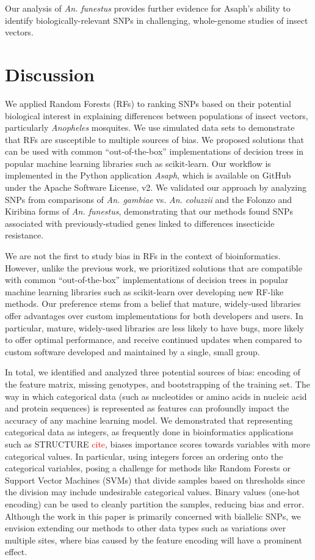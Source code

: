 Our analysis of \emph{An. funestus} provides further evidence for Asaph's ability to identify biologically-relevant SNPs in challenging, whole-genome studies of insect vectors.

\section{Discussion}
We applied Random Forests (RFs) to ranking SNPs based on their potential biological interest in explaining differences between populations of insect vectors, particularly \emph{Anopheles} mosquites.  We use simulated data sets to demonstrate that RFs are susceptible to multiple sources of bias. We proposed solutions that can be used with common ``out-of-the-box'' implementations of decision trees in popular machine learning libraries such as scikit-learn.  Our workflow is implemented in the Python application \emph{Asaph}, which is available on GitHub under the Apache Software License, v2.  We validated our approach by analyzing SNPs from comparisons of \emph{An. gambiae} vs. \emph{An. coluzzii} and the Folonzo and Kiribina forms of \emph{An. funestus}, demonstrating that our methods found SNPs associated with previously-studied genes linked to differences insecticide resistance.

We are not the first to study bias in RFs in the context of bioinformatics. However, unlike the previous work, we prioritized solutions that are compatible with common ``out-of-the-box'' implementations of decision trees in popular machine learning libraries such as scikit-learn over developing new RF-like methods.  Our preference stems from a belief that mature, widely-used libraries offer advantages over custom implementations for both developers and users.  In particular, mature, widely-used libraries are less likely to have bugs, more likely to offer optimal performance, and receive continued updates when compared to custom software developed and maintained by a single, small group.

In total, we identified and analyzed three potential sources of bias: encoding of the feature matrix, missing genotypes, and bootstrapping of the training set. The way in which categorical data (such as nucleotides or amino acids in nucleic acid and protein sequences) is represented as features can profoundly impact the accuracy of any machine learning model.  We demonstrated that representing categorical data as integers, as frequently done in bioinformatics applications such as STRUCTURE \textcolor{red}{cite}, biases importance scores towards variables with more categorical values.  In particular, using integers forces an ordering onto the categorical variables, posing a challenge for methods like Random Forests or Support Vector Machines (SVMs) that divide samples based on thresholds since the division may include undesirable categorical values.  Binary values (one-hot encoding) can be used to cleanly partition the samples, reducing bias and error.  Although the work in this paper is primarily concerned with biallelic SNPs, we envision extending our methods to other data types such as variations over multiple sites, where bias caused by the feature encoding will have a prominent effect.

